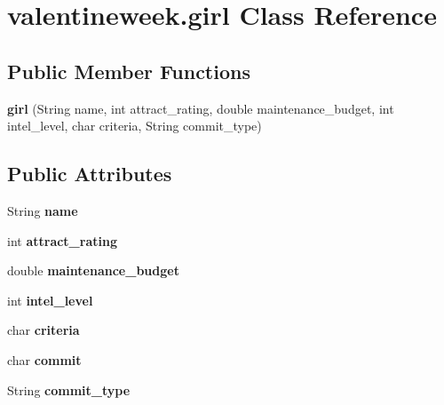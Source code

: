 \hypertarget{classvalentineweek_1_1girl}{}\section{valentineweek.\+girl Class Reference}
\label{classvalentineweek_1_1girl}
\subsection*{Public Member Functions}
\begin{DoxyCompactItemize}
\item 
\mbox{\label{classvalentineweek_1_1girl_a56bc949aa52aff5920b6f96c1f3262fa}} 
{\bfseries girl} (String name, int attract\+\_\+rating, double maintenance\+\_\+budget, int intel\+\_\+level, char criteria, String commit\+\_\+type)
\end{DoxyCompactItemize}
\subsection*{Public Attributes}
\begin{DoxyCompactItemize}
\item 
\mbox{\label{classvalentineweek_1_1girl_a3d9b5b8fd009420ef80d3a51968cf691}} 
String {\bfseries name}
\item 
\mbox{\label{classvalentineweek_1_1girl_a90429a2be27e9682352d6e069d8a4348}} 
int {\bfseries attract\+\_\+rating}
\item 
\mbox{\label{classvalentineweek_1_1girl_a9712caa3908c7317cd87f2ec8852ff2b}} 
double {\bfseries maintenance\+\_\+budget}
\item 
\mbox{\label{classvalentineweek_1_1girl_a4153a7fcdde31482beb442400bf160cd}} 
int {\bfseries intel\+\_\+level}
\item 
\mbox{\label{classvalentineweek_1_1girl_ae2bc936f78bbe8b07d9d90c9272d2b0d}} 
char {\bfseries criteria}
\item 
\mbox{\label{classvalentineweek_1_1girl_a7deab8dd5832d044d15671c472e4e081}} 
char {\bfseries commit}
\item 
\mbox{\label{classvalentineweek_1_1girl_aced18740be488a1aaa13f34356827ce0}} 
String {\bfseries commit\+\_\+type}
\end{DoxyCompactItemize}


